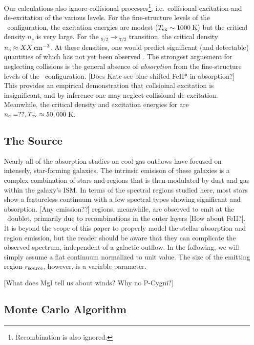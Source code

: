 \documentclass[12pt,preprint]{aastex}
\begin{document}
Our calculations also ignore collisional
processes\footnote{Recombination is also ignored.}, i.e.\ collisional
excitation and de-excitation of the various levels.  For the
fine-structure levels of the \aconfig\ configuration, the excitation
energies are modest ($T_{\rm ex} \sim 1000$\,K) but the critical
density $n_c$ is very large.  For the \aconfig$_{9/2} \to
$\aconfig$_{7/2}$ transition, the critical density $n_c \approx XX
\, {\rm cm^{-3}}$.  At these densities, one would predict significant (and
detectable) quantities of  which has not yet been observed
\citep[see also][]{pcb06}.  The strongest arguement for neglecting
collisions is the general absence of {\it absorption} from the
fine-structure levels of the \aconfig\ configuration.  [Does Kate see
blue-shifted FeII* in absorption?]  This provides an empirical
demonstration that collsioinal excitation is insignificant, and by
inference one may neglect collisional de-excitation.  Meanwhile, the
critical density and excitation energies for  are $n_c =
??, T_{\rm ex} \approx 50,000$\,K.  

\subsection{The Source}

Nearly all of the absorption studies on cool-gas outflows 
have focused on intensely, star-forming galaxies.  The
intrinsic emisison of these galaxies is a complex combination of
stars and  regions that is then modulated by dust and gas
within the galaxy's ISM.  In terms of the spectral regions studied
here, most stars show a featureless continuum with a few spectral
types showing significant  and  absorption.
[Any emission??]   regions, meanwhile, are observed to emit
at the \mgiid\ doublet, primarily due to recombinations in the outer
layers [How about FeII?].  It is beyond the scope of this paper to
properly model the 
stellar absorption and  region emission, but the reader
should be aware that they can complicate the observed spectrum,
independent of a galactic outflow.
In the following, we will simply assume a flat continuum 
normalized to unit value.  The size of the emitting
region $r_{\rm source}$, however, is a variable parameter.

[What does MgI tell us about winds?  Why no P-Cygni?]

\subsection{Monte Carlo Algorithm}
\end{document}
